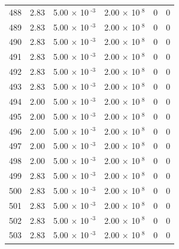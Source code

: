 \documentclass[a4paper,11pt]{article}
\begin{document}
\begin{center}
\begin{longtable}{|R{1.5cm}|R{2.4cm}|R{2.4cm}|R{2.4cm}|R{2.4cm}|R{2.4cm}|}
  488 &   2.83  &         5.00 $\times$ 10$^{\text{          -3}}$  &         2.00 $\times$ 10$^{\text{           8}}$  & 0  & 0 \\
  489 &   2.83  &         5.00 $\times$ 10$^{\text{          -3}}$  &         2.00 $\times$ 10$^{\text{           8}}$  & 0  & 0 \\
  490 &   2.83  &         5.00 $\times$ 10$^{\text{          -3}}$  &         2.00 $\times$ 10$^{\text{           8}}$  & 0  & 0 \\
  491 &   2.83  &         5.00 $\times$ 10$^{\text{          -3}}$  &         2.00 $\times$ 10$^{\text{           8}}$  & 0  & 0 \\
  492 &   2.83  &         5.00 $\times$ 10$^{\text{          -3}}$  &         2.00 $\times$ 10$^{\text{           8}}$  & 0  & 0 \\
  493 &   2.83  &         5.00 $\times$ 10$^{\text{          -3}}$  &         2.00 $\times$ 10$^{\text{           8}}$  & 0  & 0 \\
  494 &   2.00  &         5.00 $\times$ 10$^{\text{          -3}}$  &         2.00 $\times$ 10$^{\text{           8}}$  & 0  & 0 \\
  495 &   2.00  &         5.00 $\times$ 10$^{\text{          -3}}$  &         2.00 $\times$ 10$^{\text{           8}}$  & 0  & 0 \\
  496 &   2.00  &         5.00 $\times$ 10$^{\text{          -3}}$  &         2.00 $\times$ 10$^{\text{           8}}$  & 0  & 0 \\
  497 &   2.00  &         5.00 $\times$ 10$^{\text{          -3}}$  &         2.00 $\times$ 10$^{\text{           8}}$  & 0  & 0 \\
  498 &   2.00  &         5.00 $\times$ 10$^{\text{          -3}}$  &         2.00 $\times$ 10$^{\text{           8}}$  & 0  & 0 \\
  499 &   2.83  &         5.00 $\times$ 10$^{\text{          -3}}$  &         2.00 $\times$ 10$^{\text{           8}}$  & 0  & 0 \\
  500 &   2.83  &         5.00 $\times$ 10$^{\text{          -3}}$  &         2.00 $\times$ 10$^{\text{           8}}$  & 0  & 0 \\
  501 &   2.83  &         5.00 $\times$ 10$^{\text{          -3}}$  &         2.00 $\times$ 10$^{\text{           8}}$  & 0  & 0 \\
  502 &   2.83  &         5.00 $\times$ 10$^{\text{          -3}}$  &         2.00 $\times$ 10$^{\text{           8}}$  & 0  & 0 \\
  503 &   2.83  &         5.00 $\times$ 10$^{\text{          -3}}$  &         2.00 $\times$ 10$^{\text{           8}}$  & 0  & 0 \\

\end{longtable}
\end{center}
\end{document}
